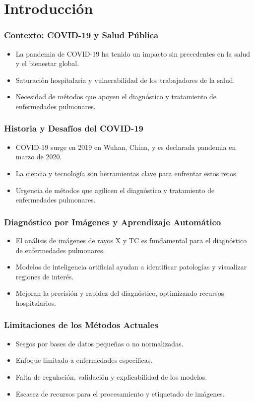 
\section{Introducción}

\begin{frame}
\frametitle{Contexto: COVID-19 y Salud Pública}
\begin{itemize}
    \item La pandemia de COVID-19 ha tenido un impacto sin precedentes en la salud y el bienestar global.
    \item Saturación hospitalaria y vulnerabilidad de los trabajadores de la salud.
    \item Necesidad de métodos que apoyen el diagnóstico y tratamiento de enfermedades pulmonares.
\end{itemize}
\end{frame}

\begin{frame}
\frametitle{Historia y Desafíos del COVID-19}
\begin{itemize}
    \item COVID-19 surge en 2019 en Wuhan, China, y es declarada pandemia en marzo de 2020.
    \item La ciencia y tecnología son herramientas clave para enfrentar estos retos.
    \item Urgencia de métodos que agilicen el diagnóstico y tratamiento de enfermedades pulmonares.
\end{itemize}
\end{frame}

\begin{frame}
\frametitle{Diagnóstico por Imágenes y Aprendizaje Automático}
\begin{itemize}
    \item El análisis de imágenes de rayos X y TC es fundamental para el diagnóstico de enfermedades pulmonares.
    \item Modelos de inteligencia artificial ayudan a identificar patologías y visualizar regiones de interés.
    \item Mejoran la precisión y rapidez del diagnóstico, optimizando recursos hospitalarios.
\end{itemize}
\end{frame}

\begin{frame}
\frametitle{Limitaciones de los Métodos Actuales}
\begin{itemize}
    \item Sesgos por bases de datos pequeñas o no normalizadas.
    \item Enfoque limitado a enfermedades específicas.
    \item Falta de regulación, validación y explicabilidad de los modelos.
    \item Escasez de recursos para el procesamiento y etiquetado de imágenes.
\end{itemize}
\end{frame}

